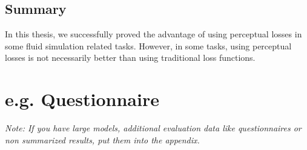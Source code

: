 \documentclass[a4paper,12pt,twoside]{report}
\begin{document}
\section{Summary}
In this thesis, we successfully proved the advantage of using perceptual losses in some fluid simulation related tasks. However, in some tasks, using perceptual losses is not necessarily better than using traditional loss functions.






\appendix

\chapter{e.g. Questionnaire}

\textit{Note: If you have large models, additional evaluation data like questionnaires or non summarized results, put them into the appendix.}


\clearpage

\clearpage

\listoftables
\clearpage


%

\end{document}
